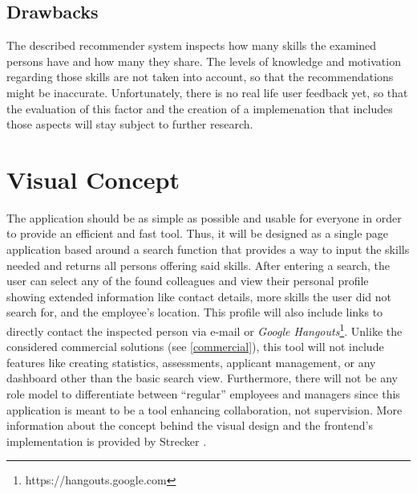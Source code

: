 \subsection{Drawbacks}
The described recommender system inspects how many skills the examined persons have and how many they share. The levels of knowledge and motivation regarding those skills are not taken into account, so that the recommendations might be inaccurate. Unfortunately, there is no real life user feedback yet, so that the evaluation of this factor and the creation of a implemenation that includes those aspects will stay subject to further research.

\section{Visual Concept}
The application should be as simple as possible and usable for everyone in order to provide an efficient and fast tool. Thus, it will be designed as a single page application based around a search function that provides a way to input the skills needed and returns all persons offering said skills. After entering a search, the user can select any of the found colleagues and view their personal profile showing extended information like contact details, more skills the user did not search for, and the employee's location. This profile will also include links to directly contact the inspected person via e-mail or \textit{Google Hangouts}\footnote{https://hangouts.google.com}. Unlike the considered commercial solutions (see \ref{commercial}), this tool will not include features like creating statistics, assessments, applicant management, or any dashboard other than the basic search view.
Furthermore, there will not be any role model to differentiate between ``regular'' employees and managers since this application is meant to be a tool enhancing collaboration, not supervision. More information about the concept behind the visual design and the frontend's implementation is provided by Strecker \cite{strecker}.

